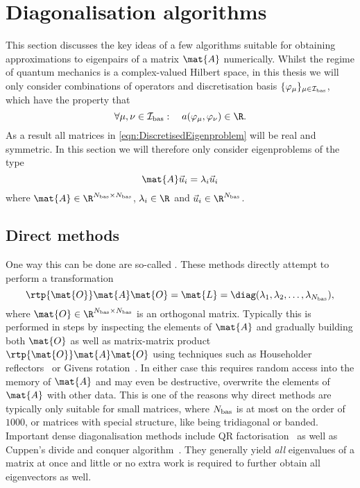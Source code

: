 \section{Diagonalisation algorithms}
\label{sec:DiagAlgos}

This section discusses the key ideas of a few algorithms suitable for obtaining
approximations to eigenpairs of a matrix $\mat{A}$ numerically.
Whilst the regime of quantum mechanics is a complex-valued Hilbert space,
in this thesis
we will only consider combinations of operators and discretisation basis
$\{\varphi_\mu\}_{\mu \in \mathcal{I}_\text{bas}}$,
which have the property that
\[ \forall \mu, \nu \in \Ibas: \quad a(\varphi_\mu, \varphi_\nu) \in \R. \]
As a result all matrices in \eqref{eqn:DiscretisedEigenproblem} will be real and symmetric.
In this section we will therefore only consider eigenproblems of the type
\[ \mat{A} \vec{u}_i = \lambda_i \vec{u}_i \]
where $\mat{A} \in \R^{\Nbas \times \Nbas}$,
$\lambda_i \in \R$ and $\vec{u}_i \in \R^{\Nbas}$.

\subsection{Direct methods}
One way this can be done are so-called .
These methods directly attempt to perform a transformation
\[ \rtp{\mat{O}} \mat{A} \mat{O} = \mat{L} = \diag(\lambda_1, \lambda_2, \ldots, \lambda_{\Nbas}), \]
where $\mat{O} \in \R^{\Nbas\times\Nbas}$ is an orthogonal matrix.
Typically this is performed in steps by inspecting the elements of $\mat{A}$
and gradually building both $\mat{O}$ as well as matrix-matrix product
$\rtp{\mat{O}} \mat{A} \mat{O}$
using techniques such as Householder reflectors~\cite{Arbenz2010}
or Givens rotation~\cite{Arbenz2010}.
In either case this requires random access into the memory of $\mat{A}$
and may even be destructive,
\ie overwrite the elements of $\mat{A}$ with other data.
This is one of the reasons why
direct methods are typically only suitable for small matrices,
where $N_\text{bas}$ is at most on the order of $1000$,
or matrices with special structure,
like being tridiagonal or banded.
Important dense diagonalisation methods include
QR factorisation~\cite{Arbenz2010,Saad2003}
as well as Cuppen's divide and conquer algorithm~\cite{Arbenz2010,Saad2003}.
They generally yield \emph{all} eigenvalues of a matrix at once
and little or no
extra work is required to further obtain all eigenvectors as well.

